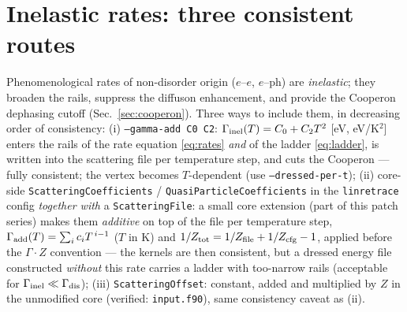 \documentclass[11pt]{article}
\newcommand{\Gam}{\Gamma}
\begin{document}
\section{Inelastic rates: three consistent routes}
\label{sec:inelastic}
Phenomenological rates of non-disorder origin ($e$--$e$, $e$--ph) are
\emph{inelastic}; they broaden the rails, suppress the diffuson
enhancement, and provide the Cooperon dephasing cutoff
(Sec.~\ref{sec:cooperon}).  Three ways to include them, in decreasing
order of consistency:
(i) \texttt{--gamma-add C0 C2}: $\Gam_{\rm inel}(T)=C_0+C_2T^2$
[eV, eV/K$^2$] enters the rails of the rate equation \eqref{eq:rates}
\emph{and} of the ladder \eqref{eq:ladder}, is written into the
scattering file per temperature step, and cuts the Cooperon --- fully
consistent; the vertex becomes $T$-dependent (use
\texttt{--dressed-per-t});
(ii) core-side \texttt{ScatteringCoefficients} /
\texttt{QuasiParticleCoefficients} in the \texttt{linretrace} config
\emph{together with} a \texttt{ScatteringFile}: a small core extension
(part of this patch series) makes them \emph{additive} on top of the
file per temperature step,
$\Gam_{\rm add}(T)=\sum_i c_i T^{\,i-1}$ ($T$ in K) and
$1/Z_{\rm tot}=1/Z_{\rm file}+1/Z_{\rm cfg}-1$, applied before the
$\Gam\cdot Z$ convention --- the kernels are then consistent, but a
dressed energy file constructed \emph{without} this rate carries a
ladder with too-narrow rails (acceptable for
$\Gam_{\rm inel}\ll\Gam_{\rm dis}$);
(iii) \texttt{ScatteringOffset}: constant, added and multiplied by $Z$
in the unmodified core (verified: \texttt{input.f90}), same consistency
caveat as (ii).
\end{document}
